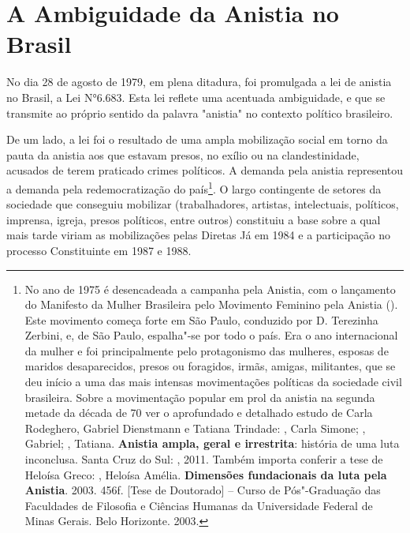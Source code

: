\section{A Ambiguidade da Anistia no Brasil}

No dia 28 de agosto de 1979, em plena ditadura, foi promulgada a lei de
anistia no Brasil, a Lei N°6.683. Esta lei reflete uma acentuada
ambiguidade, e que se transmite ao próprio sentido da palavra "anistia"
no contexto político brasileiro.

De um lado, a lei foi o resultado de uma ampla mobilização social em
torno da pauta da anistia aos que estavam presos, no exílio ou na
clandestinidade, acusados de terem praticado crimes políticos. A demanda
pela anistia representou a demanda pela redemocratização do
país\footnote{No ano de 1975 é desencadeada a campanha pela Anistia, com
  o lançamento do Manifesto da Mulher Brasileira pelo Movimento Feminino
  pela Anistia (). Este movimento começa forte em São Paulo,
  conduzido por D. Terezinha Zerbini, e, de São Paulo, espalha"-se por
  todo o país. Era o ano internacional da mulher e foi principalmente
  pelo protagonismo das mulheres, esposas de maridos desaparecidos,
  presos ou foragidos, irmãs, amigas, militantes, que se deu início a
  uma das mais intensas movimentações políticas da sociedade civil
  brasileira. Sobre a movimentação popular em prol da anistia na segunda
  metade da década de 70 ver o aprofundado e detalhado estudo de Carla
  Rodeghero, Gabriel Dienstmann e Tatiana Trindade: , Carla
  Simone; , Gabriel; , Tatiana. \textbf{Anistia ampla,
  geral e irrestrita}: história de uma luta inconclusa. Santa Cruz do
  Sul: , 2011. Também importa conferir a tese de Heloísa Greco:
  , Heloísa Amélia. \textbf{Dimensões fundacionais da luta pela
  Anistia}. 2003. 456f. {[}Tese de Doutorado{]} -- Curso de
  Pós"-Graduação das Faculdades de Filosofia e Ciências Humanas da
  Universidade Federal de Minas Gerais. Belo Horizonte. 2003.}. O largo
contingente de setores da sociedade que conseguiu mobilizar
(trabalhadores, artistas, intelectuais, políticos, imprensa, igreja,
presos políticos, entre outros) constituiu a base sobre a qual mais
tarde viriam as mobilizações pelas Diretas Já em 1984 e a participação
no processo Constituinte em 1987 e 1988.

